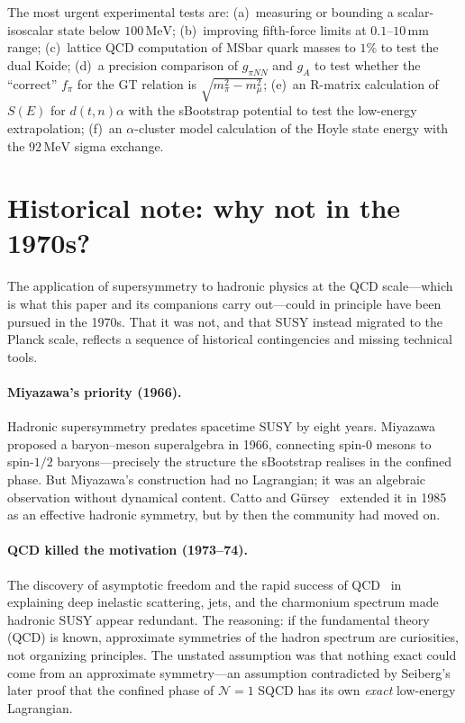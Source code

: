 \documentclass[12pt,a4paper]{article}
\newcommand{\MeV}{\,\text{MeV}}
\newcommand{\fpi}{f_\pi}
\begin{document}
The most urgent experimental tests are: (a)~measuring or bounding
a scalar-isoscalar state below $100\MeV$; (b)~improving fifth-force
limits at $0.1$--$10\,\text{mm}$ range; (c)~lattice QCD computation
of MSbar quark masses to $1\%$ to test the dual Koide; (d)~a
precision comparison of $g_{\pi NN}$ and $g_A$ to test whether the
``correct'' $\fpi$ for the GT relation is $\sqrt{m_\pi^2 - m_\mu^2}$;
(e)~an R-matrix calculation of $S(E)$ for $d(t,n)\alpha$ with the
sBootstrap potential to test the low-energy extrapolation;
(f)~an $\alpha$-cluster model calculation of the Hoyle state energy
with the $92\MeV$ sigma exchange.

\section{Historical note: why not in the 1970s?}
\label{sec:history}

The application of supersymmetry to hadronic physics at the QCD
scale---which is what this paper and its companions carry out---could
in principle have been pursued in the 1970s.  That it was not, and
that SUSY instead migrated to the Planck scale, reflects a sequence
of historical contingencies and missing technical tools.

\paragraph{Miyazawa's priority (1966).}
Hadronic supersymmetry predates spacetime SUSY by eight years.
Miyazawa~\cite{Miyazawa} proposed a baryon--meson superalgebra in
1966, connecting spin-$0$ mesons to spin-$1/2$ baryons---precisely
the structure the sBootstrap realises in the confined phase.
But Miyazawa's construction had no Lagrangian; it was an algebraic
observation without dynamical content.  Catto and
G\"ursey~\cite{CattoGursey} extended it in 1985 as an effective
hadronic symmetry, but by then the community had moved on.

\paragraph{QCD killed the motivation (1973--74).}
The discovery of asymptotic freedom and the rapid success of
QCD~\cite{GrossWilczek1973} in explaining deep inelastic scattering,
jets, and the charmonium spectrum made hadronic SUSY appear
redundant.  The reasoning: if the fundamental theory (QCD) is known,
approximate symmetries of the hadron spectrum are curiosities, not
organizing principles.  The unstated assumption was that nothing
exact could come from an approximate symmetry---an assumption
contradicted by Seiberg's later proof that the confined phase of
$\mathcal{N}=1$ SQCD has its own \emph{exact} low-energy Lagrangian.
\end{document}
